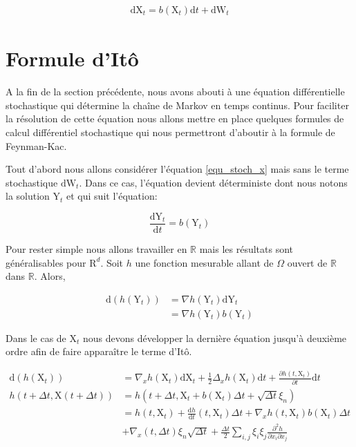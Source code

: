\documentclass[11pt]{article}
\theoremstyle{definition}
\theoremstyle{remark}
\begin{document}
\begin{align}
\label{equ_stoch_x}
\mathrm{dX}_{t} = b(\mathrm{X}_{t})\mathrm{d}t + \mathrm{dW}_{t}
\end{align}


\section{Formule d'Itô}

A la fin de la section précédente, nous avons abouti à une équation différentielle stochastique qui détermine la chaîne de Markov en temps continus. Pour faciliter la résolution de cette équation nous allons mettre en place quelques formules de calcul différentiel stochastique qui nous permettront d'aboutir à la formule de Feynman-Kac. 

Tout d'abord nous allons considérer l’équation \eqref{equ_stoch_x} mais sans le terme stochastique $\mathrm{dW}_{t}$. Dans ce cas, l'équation devient déterministe dont nous notons la solution $\mathrm{Y}_t$ et qui suit l'équation:

\begin{equation*}
\frac{\mathrm{dY}_{t}}{\mathrm{d}t} = b(\mathrm{Y}_t)
\end{equation*}



Pour rester simple nous allons travailler en $\mathbb{R}$ mais les résultats sont généralisables pour $\mathrm{R}^d$. Soit $h$ une fonction mesurable allant de $\Omega$ ouvert de $\mathbb{R}$ dans $\mathbb{R}$. Alors, 

\begin{align*}
\mathrm{d}(h(\mathrm{Y}_{t})) &= \nabla h(\mathrm{Y}_{t}) \mathrm{dY}_{t} \\
&= \nabla h(\mathrm{Y}_{t}) b(\mathrm{Y}_{t})
\end{align*}

Dans le cas de $\mathrm{X}_{t}$ nous devons développer la dernière équation jusqu'à deuxième ordre afin de faire apparaître le terme d'Itô. 

\begin{align}
\label{develop_ito_x}
\mathrm{d}(h(\mathrm{X}_{t})) &= \nabla_{x} h(\mathrm{X}_{t}) \mathrm{dX}_{t} + \frac{1}{2} \Delta_{x} h(\mathrm{X}_{t}) \mathrm{d}t + \frac{\partial h(t, \mathrm{X}_{t})}{\partial t}\mathrm{d}t \\
h(t+\Delta t, \mathrm{X}(t+\Delta t)) &= h(t+\Delta t, \mathrm{X}_{t} + b(\mathrm{X}_{t})\Delta t + \sqrt{\Delta t} \xi_{n}) \\
&= h(t, \mathrm{X}_{t}) + \frac{\mathrm{d}h}{\mathrm{d}t}(t,\mathrm{X}_{t})\Delta t + \nabla_{x} h(t, \mathrm{X}_{t})  b(\mathrm{X}_{t}) \Delta t \\
&+ \nabla_{x} (t, \Delta t) \xi_{n} \sqrt{\Delta t} + \frac{\Delta t}{2} \sum_{i,j} \xi_{i} \xi_{j} \frac{\partial^2 h}{\partial x_i \partial x_j}
\end{align}
\end{document}
